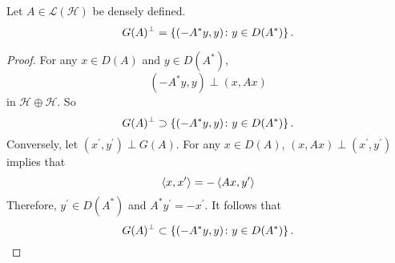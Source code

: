 \documentclass[a4paper,12pt]{article}
\begin{document}
\begin{lem}
    Let $A \in \mathcal{L}(\mathcal{H})$ be densely defined.
    \begin{equation*}
        G(A)^\perp = \left\{(-A^*y,y) \colon y \in D(A^*)\right\}.
    \end{equation*}
\end{lem}
\begin{proof}
    For any $x \in D(A)$ and $y \in D(A^*)$,
    \begin{equation*}
        (-A^*y,y) \perp (x,Ax)
    \end{equation*}
    in $\mathcal{H} \oplus \mathcal{H}$. So
    \begin{equation*}
        G(A)^\perp \supset \left\{(-A^*y,y) \colon y \in D(A^*)\right\}.
    \end{equation*}
    Conversely, let $(x^\prime,y^\prime) \perp G(A)$. For any $x \in D(A)$, $(x,Ax) \perp (x^\prime,y^\prime)$ implies that
    \begin{equation*}
        \left\langle x,x^\prime \right\rangle = - \left\langle Ax,y^\prime \right\rangle
    \end{equation*}
    Therefore, $y^\prime \in D(A^*)$ and $A^*y^\prime = - x^\prime$. It follows that
    \begin{equation*}
        G(A)^\perp \subset \left\{(-A^*y,y) \colon y \in D(A^*)\right\}. \qedhere
    \end{equation*}
\end{proof}
\end{document}
